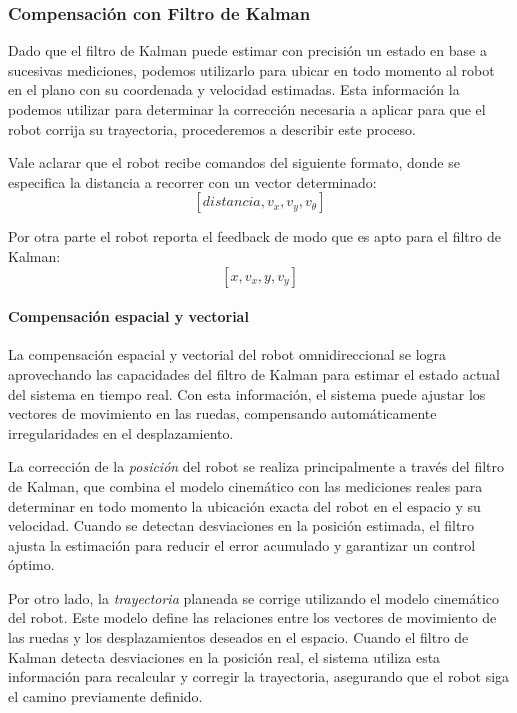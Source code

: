 \subsubsection{Compensación con Filtro de Kalman}

Dado que el filtro de Kalman puede estimar con precisión un estado en base a sucesivas mediciones, podemos utilizarlo para ubicar en todo momento al robot en el plano con su coordenada y velocidad estimadas. Esta información la podemos utilizar para determinar la corrección necesaria a aplicar para que el robot corrija su trayectoria, procederemos a describir este proceso.

Vale aclarar que el robot recibe comandos del siguiente formato, donde se especifica la distancia a recorrer con un vector determinado:
$$ [distancia, v_x, v_y, v_\theta] $$

Por otra parte el robot reporta el feedback de modo que es apto para el filtro de Kalman:
$$ [x, v_x, y, v_y] $$

\paragraph{Compensación espacial y vectorial} \mbox{} \vspace{10pt}

La compensación espacial y vectorial del robot omnidireccional se logra aprovechando las capacidades del filtro de Kalman para estimar el estado actual del sistema en tiempo real. Con esta información, el sistema puede ajustar los vectores de movimiento en las ruedas, compensando automáticamente irregularidades en el desplazamiento.

La corrección de la \textit{posición} del robot se realiza principalmente a través del filtro de Kalman, que combina el modelo cinemático con las mediciones reales para determinar en todo momento la ubicación exacta del robot en el espacio y su velocidad. Cuando se detectan desviaciones en la posición estimada, el filtro ajusta la estimación para reducir el error acumulado y garantizar un control óptimo.

Por otro lado, la \textit{trayectoria} planeada se corrige utilizando el modelo cinemático del robot. Este modelo define las relaciones entre los vectores de movimiento de las ruedas y los desplazamientos deseados en el espacio. Cuando el filtro de Kalman detecta desviaciones en la posición real, el sistema utiliza esta información para recalcular y corregir la trayectoria, asegurando que el robot siga el camino previamente definido.

